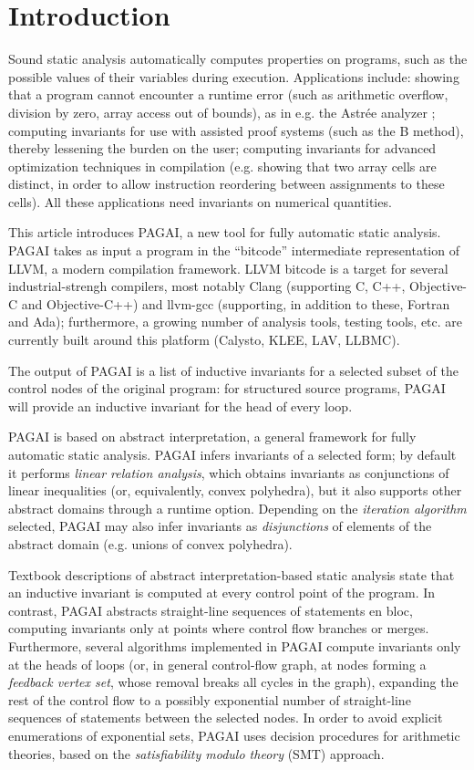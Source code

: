 \documentclass{entcs}
\begin{document}
\section{Introduction}\label{intro}
Sound static analysis automatically computes properties on programs, such as the possible values of their variables during execution.
Applications include:
showing that a program cannot encounter a runtime error (such as arithmetic overflow, division by zero, array access out of bounds), as in e.g. the Astrée analyzer \cite{ASTREE_ESOP05};
computing invariants for use with assisted proof systems (such as the B method), thereby lessening the burden on the user;
computing invariants for advanced optimization techniques in compilation (e.g. showing that two array cells are distinct, in order to allow instruction reordering between assignments to these cells).
All these applications need invariants on numerical quantities.

This article introduces PAGAI, a new tool for fully automatic static analysis.
PAGAI takes as input a program in the ``bitcode'' intermediate representation of LLVM\citep{LLVM_langref,Lattner:2004:LCF:977395.977673}, a modern compilation framework.
LLVM bitcode is a target for several industrial-strengh compilers, most notably Clang (supporting C, C++, Objective-C and Objective-C++) and llvm-gcc (supporting, in addition to these, Fortran and Ada);
furthermore, a growing number of analysis tools, testing tools, etc. are currently built around this platform (Calysto, KLEE, LAV, LLBMC).

The output of PAGAI is a list of inductive invariants for a selected subset of the control nodes of the original program:
for structured source programs, PAGAI will provide an inductive invariant for the head of every loop.

PAGAI is based on abstract interpretation, a general framework for fully automatic static analysis.
PAGAI infers invariants of a selected form; by default it performs \emph{linear relation analysis}, which obtains invariants as conjunctions of linear inequalities (or, equivalently, convex polyhedra), but it also supports other abstract domains through a runtime option.
Depending on the \emph{iteration algorithm} selected, PAGAI may also infer invariants as \emph{disjunctions} of elements of the abstract domain (e.g. unions of convex polyhedra).

Textbook descriptions of abstract interpretation-based static analysis state that an inductive invariant is computed at every control point of the program.
In contrast, PAGAI abstracts straight-line sequences of statements en bloc, computing invariants only at points where control flow branches or merges.
Furthermore, several algorithms implemented in PAGAI compute invariants only at the heads of loops (or, in general control-flow graph, at nodes forming a \emph{feedback vertex set}, whose removal breaks all cycles in the graph), expanding the rest of the control flow to a possibly exponential number of straight-line sequences of statements between the selected nodes.
In order to avoid explicit enumerations of exponential sets, PAGAI uses decision procedures for arithmetic theories, based on the \emph{satisfiability modulo theory} (SMT) approach.
\end{document}
